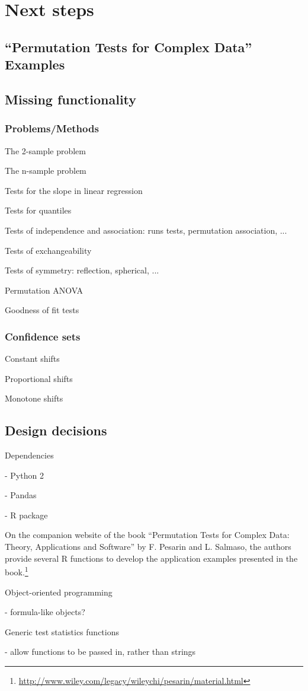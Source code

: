 \chapter{Next steps}

\section{\label{sec:book}``Permutation Tests for Complex Data'' Examples}

\cite{pesarin2010permutation}

\section{Missing functionality}


\subsection{Problems/Methods}

The 2-sample problem

The n-sample problem

Tests for the slope in linear regression 

Tests for quantiles

Tests of independence and association: runs tests, permutation association, ...

Tests of exchangeability

Tests of symmetry: reflection, spherical, ...

Permutation ANOVA

Goodness of fit tests


\subsection{Confidence sets}

Constant shifts

Proportional shifts

Monotone shifts

\section{Design decisions}

Dependencies

- Python 2

- Pandas


- R package

On the companion website of the book ``Permutation Tests for Complex Data:
Theory, Applications and Software'' by F. Pesarin and L. Salmaso, the
authors provide several R functions to develop the application examples
presented in the book.\footnote{\url{http://www.wiley.com/legacy/wileychi/pesarin/material.html}}

Object-oriented programming

- formula-like objects?

Generic test statistics functions

- allow functions to be passed in, rather than strings
